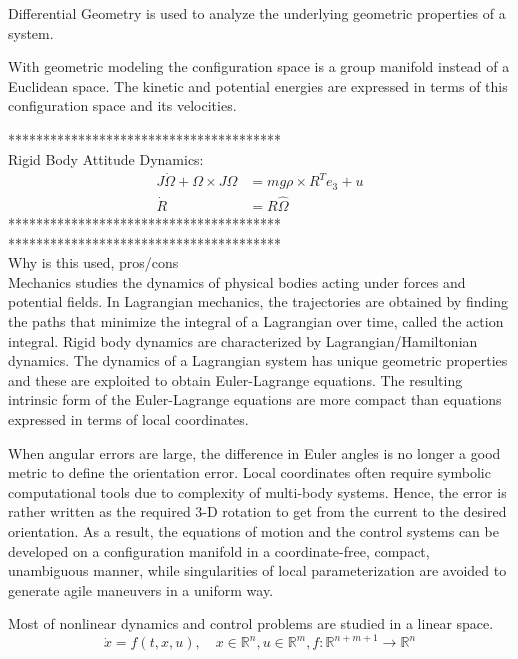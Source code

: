 Differential Geometry is used to analyze the underlying geometric properties of a system.

With geometric modeling the configuration space is a group manifold instead of a Euclidean space. The kinetic and potential energies are expressed in terms of this configuration space and its velocities.

***************************************\\
Rigid Body Attitude Dynamics:
\begin{align}\label{eq:eomrigidbody}
J\dot{\Omega}+\Omega\times J\Omega &= mg\rho\times R^Te_3+u\\
\dot{R} &= R\hat{\Omega}
\end{align}
***************************************\\


***************************************\\
\cite{Lee}
Why is this used, pros/cons\\

Mechanics studies the dynamics of physical bodies acting under forces and potential fields. 
In Lagrangian mechanics, the trajectories are obtained by finding the paths that minimize the integral of a Lagrangian over time, called the action integral. 
Rigid body dynamics are characterized by Lagrangian/Hamiltonian dynamics. The dynamics of a Lagrangian system has unique geometric properties and these are exploited to obtain Euler-Lagrange equations. The resulting intrinsic form of the Euler-Lagrange equations are more compact than equations expressed in terms of local coordinates.

When angular errors are large, the difference in Euler angles is no longer a good metric to define the orientation error. Local coordinates often require symbolic computational tools due to complexity of multi-body systems. Hence, the error is rather written as the required 3-D rotation to get from the current to the desired orientation. As a result, the equations of motion and the control systems can be developed on a configuration manifold in a coordinate-free, compact, unambiguous manner, while singularities of local parameterization are avoided to generate agile maneuvers in a uniform way. 				

Most of nonlinear dynamics and control problems are studied in a linear space.\\
\begin{equation}\label{key}
\dot{x}=f(t,x,u), \quad x\in\mathbb{R}^n, u\in\mathbb{R}^m, f:\mathbb{R}^{n+m+1}\rightarrow\mathbb{R}^n
\end{equation}

